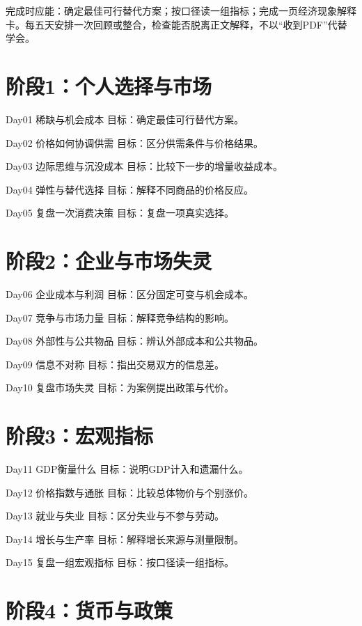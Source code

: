 \documentclass[11pt]{article}
\newcommand{\Needspace}[1]{\par\ifdim\dimexpr\pagegoal-\pagetotal\relax<#1\relax\newpage\fi}
\begin{document}
完成时应能：确定最佳可行替代方案；按口径读一组指标；完成一页经济现象解释卡。每五天安排一次回顾或整合，检查能否脱离正文解释，不以“收到PDF”代替学会。

\Needspace{5\baselineskip}\section*{阶段1：个人选择与市场}

Day01  稀缺与机会成本
目标：确定最佳可行替代方案。

Day02  价格如何协调供需
目标：区分供需条件与价格结果。

Day03  边际思维与沉没成本
目标：比较下一步的增量收益成本。

Day04  弹性与替代选择
目标：解释不同商品的价格反应。

Day05  复盘一次消费决策
目标：复盘一项真实选择。

\Needspace{5\baselineskip}\section*{阶段2：企业与市场失灵}

Day06  企业成本与利润
目标：区分固定可变与机会成本。

Day07  竞争与市场力量
目标：解释竞争结构的影响。

Day08  外部性与公共物品
目标：辨认外部成本和公共物品。

Day09  信息不对称
目标：指出交易双方的信息差。

Day10  复盘市场失灵
目标：为案例提出政策与代价。

\Needspace{5\baselineskip}\section*{阶段3：宏观指标}

Day11  GDP衡量什么
目标：说明GDP计入和遗漏什么。

Day12  价格指数与通胀
目标：比较总体物价与个别涨价。

Day13  就业与失业
目标：区分失业与不参与劳动。

Day14  增长与生产率
目标：解释增长来源与测量限制。

Day15  复盘一组宏观指标
目标：按口径读一组指标。

\Needspace{5\baselineskip}\section*{阶段4：货币与政策}
\end{document}
